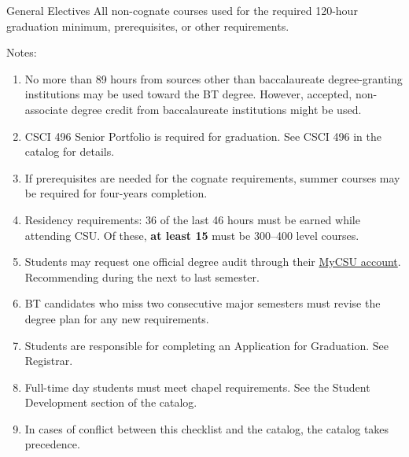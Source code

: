 \begin{reqgroup}{General Electives}
All non-cognate courses used for the required 120-hour graduation minimum, prerequisites, or other requirements.
\end{reqgroup}

Notes:%
\begin{enumerate}\footnotesize
	\item No more than 89 hours from sources other than baccalaureate degree-granting institutions may be used toward the BT degree. However, accepted, non-associate degree credit from baccalaureate institutions might be used.
	\item CSCI 496 Senior Portfolio is required for graduation. See CSCI 496 in the catalog for details.
	\item If prerequisites are needed for the cognate requirements, summer courses may be required for four-years completion.
	\item Residency requirements: 36 of the last 46 hours must be earned while attending CSU. Of these, \textbf{at least 15} must be 300--400 level courses.
	\item Students may request one official degree audit through their \href{https://portal.csuniv.edu/}{MyCSU account}. Recommending during the next to last semester.
	\item BT candidates who miss two consecutive major semesters must revise the degree plan for any new requirements.
	\item Students are responsible for completing an Application for Graduation. See Registrar.
	\item Full-time day students must meet chapel requirements. See the Student Development section of the catalog.
	\item In cases of conflict between this checklist and the catalog, the catalog takes precedence.
\end{enumerate}